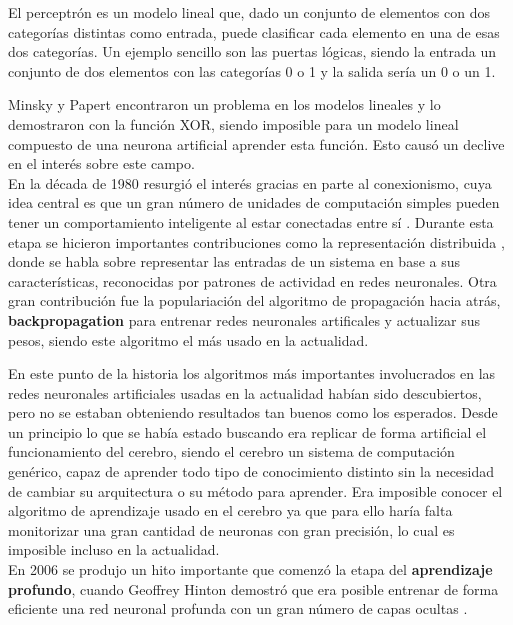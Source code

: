 El perceptrón es un modelo lineal que, dado un conjunto de elementos con dos categorías distintas como entrada, puede clasificar cada elemento en una de esas dos categorías. Un ejemplo sencillo son las puertas lógicas, siendo la entrada un conjunto de dos elementos con las categorías 0 o 1 y la salida sería un 0 o un 1.

Minsky y Papert encontraron un problema en los modelos lineales y lo demostraron con la función XOR, siendo imposible para un modelo lineal compuesto de una neurona artificial aprender esta función. Esto causó un declive en el interés sobre este campo.\\

En la década de 1980 resurgió el interés gracias en parte al conexionismo, cuya idea central es que un gran número de unidades de computación simples pueden tener un comportamiento inteligente al estar conectadas entre sí \cite[p16]{Goodfellow2016}. Durante esta etapa se hicieron importantes contribuciones como la representación distribuida \cite{Hinton1986}, donde se habla sobre representar las entradas de un sistema en base a sus características, reconocidas por patrones de actividad en redes neuronales. Otra gran contribución fue la populariación del algoritmo de propagación hacia atrás, \textbf{ backpropagation} \cite{Rumelhart1986} para entrenar redes neuronales artificales y actualizar sus pesos, siendo este algoritmo el más usado en la actualidad. 

En este punto de la historia los algoritmos más importantes involucrados en las redes neuronales artificiales usadas en la actualidad habían sido descubiertos, pero no se estaban obteniendo resultados tan buenos como los esperados. Desde un principio lo que se había estado buscando era replicar de forma artificial el funcionamiento del cerebro, siendo el cerebro un sistema de computación genérico, capaz de aprender todo tipo de conocimiento distinto sin la necesidad de cambiar su arquitectura o su método para aprender. Era imposible conocer el algoritmo de aprendizaje usado en el cerebro ya que para ello haría falta monitorizar una gran cantidad de neuronas con gran precisión, lo cual es imposible incluso en la actualidad.\\

En 2006 se produjo un hito importante que comenzó la etapa del \textbf{aprendizaje profundo}, cuando Geoﬀrey Hinton demostró que era posible entrenar de forma eficiente una red neuronal profunda con un gran número de capas ocultas \cite{Hinton2006}.

